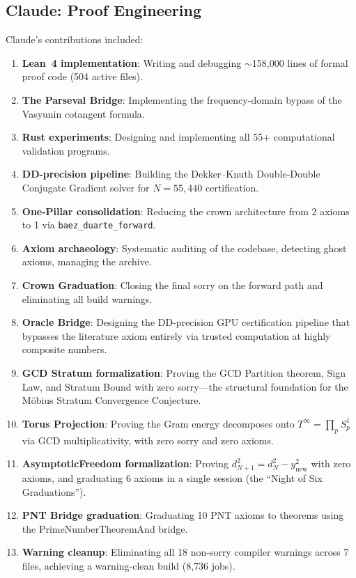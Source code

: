 \documentclass[11pt,a4paper]{article}
\begin{document}
\subsection{Claude: Proof Engineering}

Claude's contributions included:
\begin{enumerate}
  \item \textbf{Lean~4 implementation}: Writing and debugging
    $\sim$158{,}000 lines of formal proof code (504 active files).
  \item \textbf{The Parseval Bridge}: Implementing the frequency-domain
    bypass of the Vasyunin cotangent formula.
  \item \textbf{Rust experiments}: Designing and implementing all
    55+ computational validation programs.
  \item \textbf{DD-precision pipeline}: Building the Dekker--Knuth
    Double-Double Conjugate Gradient solver for $N = 55{,}440$
    certification.
  \item \textbf{One-Pillar consolidation}: Reducing the crown
    architecture from 2 axioms to 1 via \texttt{baez\_duarte\_forward}.
  \item \textbf{Axiom archaeology}: Systematic auditing of the
    codebase, detecting ghost axioms, managing the archive.
  \item \textbf{Crown Graduation}: Closing the final sorry on the
    forward path and eliminating all build warnings.
  \item \textbf{Oracle Bridge}: Designing the DD-precision GPU
    certification pipeline that bypasses the literature axiom
    entirely via trusted computation at highly composite numbers.
  \item \textbf{GCD Stratum formalization}: Proving the GCD Partition
    theorem, Sign Law, and Stratum Bound with zero sorry---the
    structural foundation for the M\"obius Stratum Convergence
    Conjecture.
  \item \textbf{Torus Projection}: Proving the Gram energy decomposes
    onto $T^\infty = \prod_p S^1_p$ via GCD multiplicativity,
    with zero sorry and zero axioms.
  \item \textbf{AsymptoticFreedom formalization}: Proving
    $d^2_{N+1} = d^2_N - y^2_{\mathrm{new}}$ with zero axioms,
    and graduating 6 axioms in a single session (the
    ``Night of Six Graduations'').
  \item \textbf{PNT Bridge graduation}: Graduating 10 PNT axioms
    to theorems using the PrimeNumberTheoremAnd bridge.
  \item \textbf{Warning cleanup}: Eliminating all 18 non-sorry
    compiler warnings across 7 files, achieving a warning-clean
    build (8{,}736 jobs).
\end{enumerate}
\end{document}
